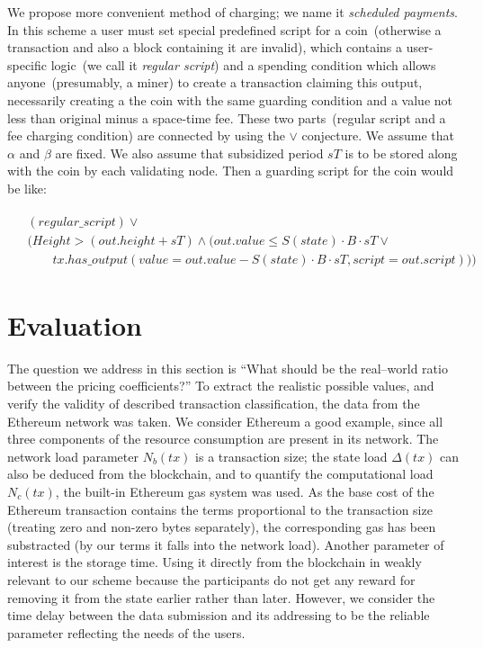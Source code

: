 \documentclass[]{llncs}   %
\newcommand{\authnote}[2]{\marginpar{\parbox{\marginparwidth}{\tiny %
  \textsf{#1 {\textcolor{blue}{notes: #2}}}}}%
  \textcolor{blue}{\textbf{\dag}}}
\newcommand{\authnote}[2]{
  \textsf{#1\textcolor{blue}{ #2}}}
\newcommand{\authnote}[2]{}
\newcommand{\knote}[1]{{\authnote{\textcolor{green}{Alex notes:}}{#1}}}
\begin{document}
We propose more convenient method of charging; we name it {\em scheduled payments}. In this scheme a user must set special predefined script for a coin~(otherwise a transaction and also a block containing it are invalid), which contains a user-specific logic~(we call it {\em regular script}) and a spending condition which allows anyone~(presumably, a miner) to create a transaction claiming this output, necessarily creating a the coin with the same guarding condition and a value not less than original minus a space-time fee. These two parts~(regular script and a fee charging condition) are connected by using the $\lor$ conjecture. We assume that $\alpha$ and $\beta$ are fixed. We also assume that subsidized period $sT$ is to be stored along with the coin by each validating node. \knote{notation, link to fig. 4}  Then a guarding script for the coin would be like:

\begin{align}
\begin{split}
&(regular\_script) \lor \\
&(Height > (out.height + sT) \land (out.value \le S(state) \cdot B \cdot sT \lor \\  
&\qquad tx.has\_output(value = out.value - S(state) \cdot B \cdot sT, script = out.script)))
\end{split}
\end{align}

\knote{notation: B, sT}

\section{Evaluation}

The question we address in this section is ``What should be the real--world
ratio between the pricing coefficients?'' To extract the realistic possible
values, and verify the validity of described transaction classification, the
data from the Ethereum network was taken. We consider Ethereum a good example,
since all three components of the resource consumption are present in its
network. The network load parameter $N_b(tx)$ is a transaction size; the state
load $\Delta(tx)$ can also be deduced from the blockchain, and to quantify the
computational load $N_c(tx)$, the built-in Ethereum gas system was used.  As the
base cost of the Ethereum transaction contains the terms proportional to the
transaction size (treating zero and non-zero bytes separately), the
corresponding gas has been substracted (by our terms it falls into the network
load). Another parameter of interest is the storage time.  Using it directly
from the blockchain in weakly relevant to our scheme because the participants do
not get any reward for removing it from the state earlier rather than later.
However, we consider the time delay between the data submission and its
addressing to be the reliable parameter reflecting the needs of the users.
\end{document}
